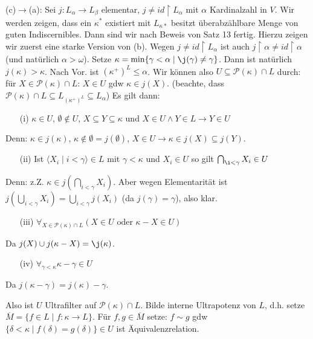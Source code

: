 \documentclass[a4paper,fontsize=11pt]{scrartcl}
\renewcommand{\bar}[1]{\overline{#1}}
\begin{document}
		(c)$\to$(a): Sei $j\colon L_{\alpha}\to L_{\beta}$ elementar, $j\neq id\upharpoonright L_{\alpha}$ mit $\alpha$ Kardinalzahl in $V$.
		Wir werden zeigen, dass ein $\kappa^*$ existiert mit $L_{\kappa*}$ besitzt überabzählbare Menge von guten Indiscernibles.
		Dann sind wir nach Beweis von Satz 13 fertig.
		Hierzu zeigen wir zuerst eine starke Version von (b). 
		Wegen $j\neq id\upharpoonright L_{\alpha}$ ist auch $j\upharpoonright\alpha\neq id\upharpoonright\alpha$ (und natürlich $\alpha>\omega$).
		Setze $\kappa=\min\{\gamma<\alpha\mid \j(\gamma)\neq\gamma\}$.
		Dann ist natürlich $j(\kappa)>\kappa$.
		Nach Vor. ist $(\kappa^+)^L\le\alpha$.
		Wir können also $U\subseteq \mathcal P(\kappa)\cap L$ durch:
		für $X\in \mathcal P(\kappa)\cap L$: $X\in U$ gdw $\kappa \in j(X)$.
		(beachte, dass $\mathcal P(\kappa)\cap L\subseteq L_{(\kappa^+)^L}\subseteq L_{\alpha}$)
		Es gilt dann:\begin{itemize}
			\item[(i)] $\kappa\in U$, $\emptyset\not\in U$, $X\subseteq Y\subseteq \kappa$ und $X\in U \land Y\in L\to Y\in U$
		\end{itemize}
		Denn: $\kappa\in j(\kappa)$, $\kappa\not\in\emptyset=j(\emptyset)$, $X\in U\to \kappa\in j(X)\subseteq j(Y)$.
		\begin{itemize}
			\item[(ii)] Ist $\langle X_i\mid i<\gamma\rangle\in L$ mit $\gamma<\kappa$ und $X_i\in U$ so gilt $\bigcap_{\i<\gamma} X_i\in U$
		\end{itemize}
		Denn: z.Z. $\kappa\in j(\bigcap_{i<\gamma} X_i)$. 
		Aber wegen Elementarität ist $j(\bigcup_{i<\gamma}X_i)=\bigcup_{i<\gamma}j(X_i)$ (da $j(\gamma)=\gamma$), also klar.
		\begin{itemize}
			\item[(iii)] $\forall_{X\in \mathcal P(\kappa)\cap L} (X\in U \mbox{ oder } \kappa-X\in U)$
		\end{itemize}
		Da $j(X)\cup j(\kappa-X)=\j(\kappa)$.
		\begin{itemize}
			\item[(iv)] $\forall_{\gamma<\kappa} \kappa-\gamma\in U$
		\end{itemize}
		Da $j(\kappa-\gamma)=j(\kappa)-\gamma$.
		
		Also ist $U$ Ultrafilter auf $\mathcal P(\kappa)\cap L$.
		Bilde interne Ultrapotenz von $L$, d.h. setze $\bar M=\{ f\in L\mid f\colon\kappa\to L\}$.
		Für $f,g\in \bar M$ setze: $f\sim g$ gdw $\{\delta<\kappa\mid f(\delta)=g(\delta)\}\in U$ ist Äquivalenzrelation.
		
\end{document}
